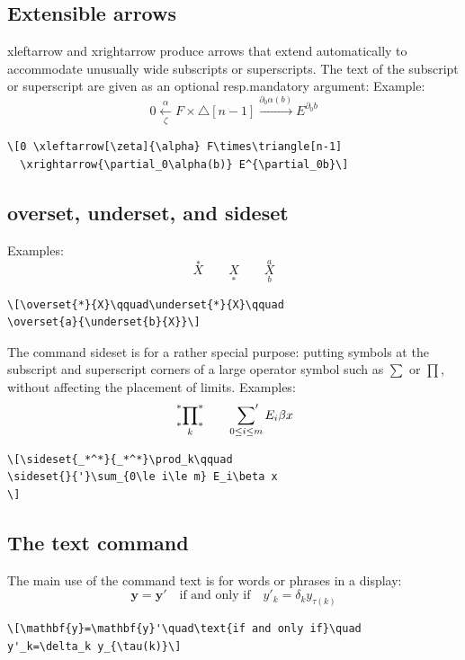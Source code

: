 \documentclass{article}
\newcommand{\ntt}{\normalfont\ttfamily}
\newcommand{\cn}[1]{{\protect\ntt\bslash#1}}
\theoremstyle{definition}
\theoremstyle{remark}
\begin{document}
\subsection{Extensible arrows}
\cn{xleftarrow} and \cn{xrightarrow} produce
arrows that extend automatically to accommodate unusually wide
subscripts or superscripts.  The text of the subscript or superscript
are given as an optional resp.\@ mandatory argument:
Example:
\[0 \xleftarrow[\zeta]{\alpha} F\times\triangle[n-1]
  \xrightarrow{\partial_0\alpha(b)} E^{\partial_0b}\]
\begin{verbatim}
\[0 \xleftarrow[\zeta]{\alpha} F\times\triangle[n-1]
  \xrightarrow{\partial_0\alpha(b)} E^{\partial_0b}\]
\end{verbatim}

\subsection{\cn{overset}, \cn{underset}, and \cn{sideset}}
Examples:
\[\overset{*}{X}\qquad\underset{*}{X}\qquad
\overset{a}{\underset{b}{X}}\]
\begin{verbatim}
\[\overset{*}{X}\qquad\underset{*}{X}\qquad
\overset{a}{\underset{b}{X}}\]
\end{verbatim}

The command \cn{sideset} is for a rather special
purpose: putting symbols at the subscript and superscript
corners of a large operator symbol such as $\sum$ or $\prod$,
without affecting the placement of limits.
Examples:
\[\sideset{_*^*}{_*^*}\prod_k\qquad
\sideset{}{'}\sum_{0\le i\le m} E_i\beta x
\]
\begin{verbatim}
\[\sideset{_*^*}{_*^*}\prod_k\qquad
\sideset{}{'}\sum_{0\le i\le m} E_i\beta x
\]
\end{verbatim}

\subsection{The \cn{text} command}
The main use of the command \cn{text} is for words or phrases in a
display:
\[\mathbf{y}=\mathbf{y}'\quad\text{if and only if}\quad
y'_k=\delta_k y_{\tau(k)}\]
\begin{verbatim}
\[\mathbf{y}=\mathbf{y}'\quad\text{if and only if}\quad
y'_k=\delta_k y_{\tau(k)}\]
\end{verbatim}
\end{document}
